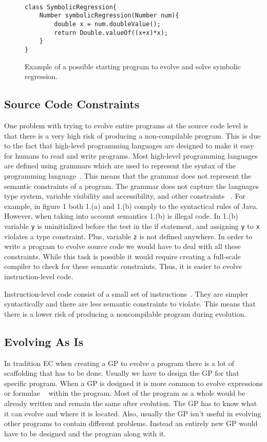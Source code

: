 \documentclass{sig-alternate}
\begin{document}
\begin{figure}
\centering
{\tt
\begin{verbatim}
class SymbolicRegression{
    Number symbolicRegression(Number num){
        double x = num.doubleValue();
        return Double.valueOf((x+x)*x);
    }
}

\end{verbatim}
}
\caption{Example of a possible starting program to evolve and solve symbolic regression.}
\end{figure}


\subsection{Source Code Constraints}
One problem with trying to evolve entire programs at the source code level is that there is a very high risk of producing a non-compilable program. This is due to the fact that high-level programming languages are designed to make it easy for humans to read and write programs. Most high-level programming languages are defined using grammars which are used to represent the syntax of the programming language~\cite{Oracle:2013,Assembly:2010}. This means that the grammar does not represent the semantic constraints of a program. The grammar does not capture the languages type system, variable visibility and accessibility, and other constraints ~\cite{FINCH:2011}. For example, in figure 1 both 1.(a) and 1.(b) comply to the syntactical rules of Java. However, when taking into account semantics 1.(b) is illegal code. In 1.(b) variable \texttt{y} is uninitialized before the test in the if statement, and assigning \texttt{y} to \texttt{x} violates a type constraint. Plus, variable \texttt{z} is not defined anywhere.  In order to write a program to evolve source code we would have to deal with all these constraints. While this task is possible it would require creating a full-scale compiler to check for these semantic constraints. Thus, it is easier to evolve instruction-level code. \par

Instruction-level code consist of a small set of instructions~\cite{Assembly:2010}. They are simpler syntactically and there are less semantic constraints to violate. This means that there is a lower risk of producing a noncompilable program during evolution. 

\subsection{Evolving As Is}
In tradition EC when creating a GP to evolve a program there is a lot of scaffolding that has to be done. Usually we have to design the GP for that specific program. When a GP is designed it is more common to evolve expressions or formulae ~\cite{FINCH:2011} within the program. Most of the program as a whole would be already written and remain the same after evolution. The GP has to know what it can evolve and where it is located. Also, usually the GP isn't useful in evolving other programs to contain different problems. Instead an entirely new GP would have to be designed and the program along with it.
\end{document}
